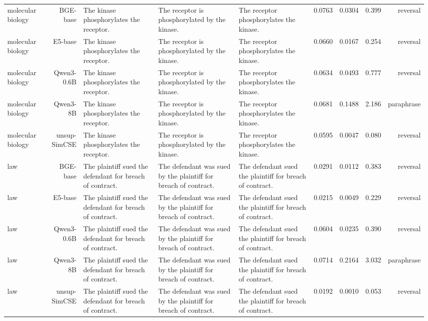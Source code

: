 \documentclass[10pt]{article}
\begin{document}
\begin{longtable}{lr>{\raggedright\arraybackslash}p{4.6cm}>{\raggedright\arraybackslash}p{4.6cm}>{\raggedright\arraybackslash}p{4.6cm}rrrr}
molecular biology & BGE-base & The kinase phosphorylates the receptor. & The receptor is phosphorylated by the kinase. & The receptor phosphorylates the kinase. & 0.0763 & 0.0304 & 0.399 & reversal \\
molecular biology & E5-base & The kinase phosphorylates the receptor. & The receptor is phosphorylated by the kinase. & The receptor phosphorylates the kinase. & 0.0660 & 0.0167 & 0.254 & reversal \\
molecular biology & Qwen3-0.6B & The kinase phosphorylates the receptor. & The receptor is phosphorylated by the kinase. & The receptor phosphorylates the kinase. & 0.0634 & 0.0493 & 0.777 & reversal \\
molecular biology & Qwen3-8B & The kinase phosphorylates the receptor. & The receptor is phosphorylated by the kinase. & The receptor phosphorylates the kinase. & 0.0681 & 0.1488 & 2.186 & paraphrase \\
molecular biology & unsup-SimCSE & The kinase phosphorylates the receptor. & The receptor is phosphorylated by the kinase. & The receptor phosphorylates the kinase. & 0.0595 & 0.0047 & 0.080 & reversal \\
law & BGE-base & The plaintiff sued the defendant for breach of contract. & The defendant was sued by the plaintiff for breach of contract. & The defendant sued the plaintiff for breach of contract. & 0.0291 & 0.0112 & 0.383 & reversal \\
law & E5-base & The plaintiff sued the defendant for breach of contract. & The defendant was sued by the plaintiff for breach of contract. & The defendant sued the plaintiff for breach of contract. & 0.0215 & 0.0049 & 0.229 & reversal \\
law & Qwen3-0.6B & The plaintiff sued the defendant for breach of contract. & The defendant was sued by the plaintiff for breach of contract. & The defendant sued the plaintiff for breach of contract. & 0.0604 & 0.0235 & 0.390 & reversal \\
law & Qwen3-8B & The plaintiff sued the defendant for breach of contract. & The defendant was sued by the plaintiff for breach of contract. & The defendant sued the plaintiff for breach of contract. & 0.0714 & 0.2164 & 3.032 & paraphrase \\
law & unsup-SimCSE & The plaintiff sued the defendant for breach of contract. & The defendant was sued by the plaintiff for breach of contract. & The defendant sued the plaintiff for breach of contract. & 0.0192 & 0.0010 & 0.053 & reversal \\

\end{longtable}
\end{document}
